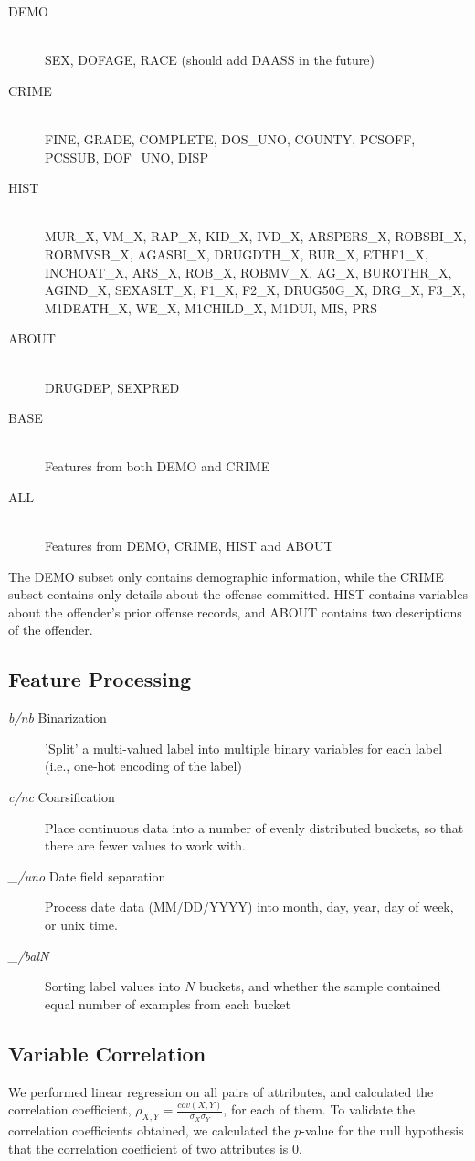 \documentclass[11pt,letter]{article}
\begin{document}
\begin{description}
	\item [DEMO] \hfill \\SEX, DOFAGE, RACE (should add DAASS in the future)
	\item [CRIME] \hfill \\FINE, GRADE, COMPLETE, DOS\_UNO, COUNTY, PCSOFF, PCSSUB, DOF\_UNO, DISP
	\item [HIST] \hfill \\MUR\_X, VM\_X, RAP\_X, KID\_X, IVD\_X, ARSPERS\_X, ROBSBI\_X, ROBMVSB\_X, AGASBI\_X, DRUGDTH\_X, BUR\_X, ETHF1\_X, INCHOAT\_X, ARS\_X, ROB\_X, ROBMV\_X, AG\_X, BUROTHR\_X, AGIND\_X, SEXASLT\_X, F1\_X, F2\_X, DRUG50G\_X, DRG\_X, F3\_X, M1DEATH\_X, WE\_X, M1CHILD\_X, M1DUI, MIS, PRS
	\item [ABOUT] \hfill \\DRUGDEP, SEXPRED
	\item [BASE] \hfill \\Features from both DEMO and CRIME
	\item [ALL] \hfill \\Features from DEMO, CRIME, HIST and ABOUT
\end{description}
The DEMO subset only contains demographic information, while the CRIME subset contains only details about the offense committed. HIST contains variables about the offender's prior offense records, and ABOUT contains two descriptions of the offender.

\subsection{Feature Processing}
\begin{description}
	\item [\emph{b/nb} Binarization] 'Split' a multi-valued label into multiple binary variables for each label (i.e., one-hot encoding of the label)
	\item [\emph{c/nc} Coarsification] Place continuous data into a number of evenly distributed buckets, so that there are fewer values to work with.
	\item [\emph{\_/uno} Date field separation] Process date data (MM/DD/YYYY) into month, day, year, day of week, or unix time.
	\item [\emph{\_/balN}] Sorting label values into $N$ buckets, and whether the sample contained equal number of examples from each bucket
\end{description}


\subsection{Variable Correlation}
We performed linear regression on all pairs of attributes, and calculated the correlation coefficient, $\rho_{X,Y} = \frac{cov(X,Y)}{\sigma_X\sigma_Y}$, for each of them. To validate the correlation coefficients obtained, we calculated the $p$-value for the null hypothesis that the correlation coefficient of two attributes is 0.
\end{document}
